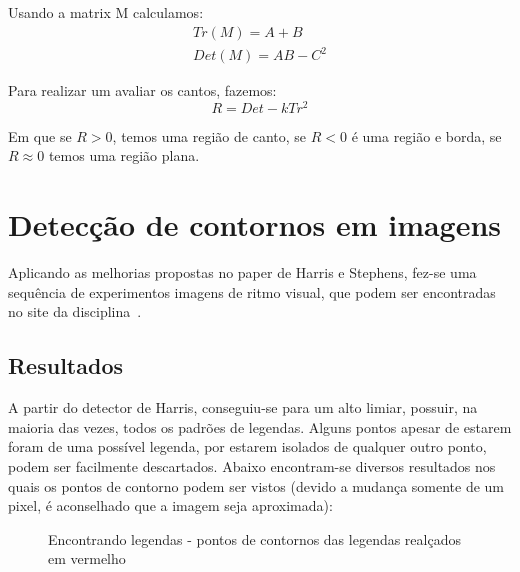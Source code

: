 \documentclass[10pt,a4paper]{article}
\begin{document}
\begin{enumerate}
Usando a matrix M calculamos:
\begin{eqnarray*}
Tr(M) = A + B\\
Det(M) = AB-C^2
\end{eqnarray*}

Para realizar um avaliar os cantos, fazemos:
\begin{equation}
R = Det - kTr^2
\end{equation}

Em que se $R>0$, temos uma região de canto, se $R<0$ é uma região e
borda, se $R \approx 0$ temos uma região plana.
\end{enumerate}

\section{Detecção de contornos em imagens}
Aplicando as melhorias propostas no paper de Harris e Stephens,
fez-se uma sequência de experimentos imagens de ritmo visual, que
podem ser encontradas no site
da disciplina~\cite{imagens}. 

\subsection{Resultados}
A partir do detector de Harris, conseguiu-se para um alto limiar,
possuir, na maioria das vezes, todos os padrões de legendas. Alguns
pontos apesar de estarem foram de uma possível legenda, por estarem
isolados de qualquer outro ponto, podem ser facilmente descartados. 
Abaixo encontram-se diversos resultados nos quais os pontos de
contorno podem ser vistos (devido a mudança somente de um pixel, é
aconselhado que a imagem seja aproximada):

\begin{figure}[h!]
  \begin{center}
    \hspace{10mm}
    \caption{Encontrando legendas - pontos de contornos das legendas
      realçados em vermelho}
  \end{center}
\end{figure}
\end{document}
